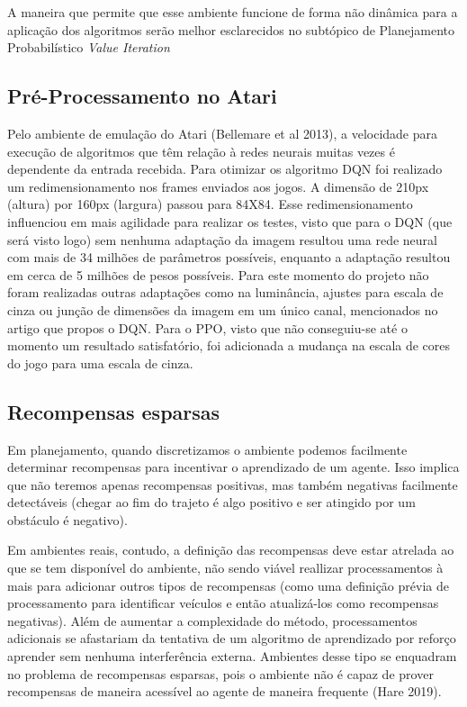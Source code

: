 \documentclass[letterpaper]{article} %
\begin{document}
A maneira que permite que esse ambiente funcione de forma não dinâmica para a aplicação dos algoritmos serão melhor esclarecidos no subtópico de Planejamento Probabilístico \textit{Value Iteration}

\subsection{Pré-Processamento no Atari}
Pelo ambiente de emulação do Atari (Bellemare et al 2013), a velocidade para execução de algoritmos que têm relação à redes neurais muitas vezes é dependente da entrada recebida. Para otimizar os algoritmo DQN foi realizado um redimensionamento nos frames enviados aos jogos. A dimensão de 210px (altura) por 160px (largura) passou para 84X84. Esse redimensionamento influenciou em mais agilidade para realizar os testes, visto que para o DQN (que será visto logo) sem nenhuma adaptação da imagem resultou uma rede neural com mais de 34 milhões de parâmetros possíveis, enquanto a adaptação resultou em cerca de 5 milhões de pesos possíveis. Para este momento do projeto não foram realizadas outras adaptações como na luminância, ajustes para escala de cinza ou junção de dimensões da imagem em um único canal, mencionados no artigo que propos o DQN. Para o PPO, visto que não conseguiu-se até o momento um resultado satisfatório, foi adicionada a mudança na escala de cores do jogo para uma escala de cinza.

\subsection{Recompensas esparsas}
Em planejamento, quando discretizamos o ambiente podemos facilmente determinar recompensas para incentivar o aprendizado de um agente. Isso implica que não teremos apenas recompensas positivas, mas também negativas facilmente detectáveis (chegar ao fim do trajeto é algo positivo e ser atingido por um obstáculo é negativo).

Em ambientes reais, contudo, a definição das recompensas deve estar atrelada ao que se tem disponível do ambiente, não sendo viável reallizar processamentos à mais para adicionar outros tipos de recompensas (como uma definição prévia de processamento para identificar veículos e então atualizá-los como recompensas negativas). Além de aumentar a complexidade do método, processamentos adicionais se afastariam da tentativa de um algoritmo de aprendizado por reforço aprender sem nenhuma interferência externa. Ambientes desse tipo se enquadram no problema de recompensas esparsas, pois o ambiente não é capaz de prover recompensas de maneira acessível ao agente de maneira frequente (Hare 2019).
\end{document}
